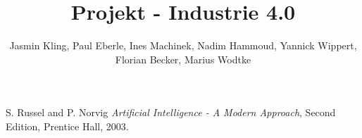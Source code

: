 \documentclass[cover]{isas-seminar}
\title{Projekt - Industrie 4.0}
\author{Jasmin Kling, Paul Eberle, Ines Machinek, Nadim Hammoud, Yannick Wippert, Florian Becker, Marius Wodtke}
\begin{document}
\maketitle

\begin{abstract}
\end{abstract}
\clearpage
\tableofcontents
\cleardoublepage













%

%

\newpage 


\begin{thebibliography}{99}

 {\sc S. Russel and P. Norvig }  \textit{Artificial Intelligence - A Modern Approach},
Second Edition, Prentice Hall, 2003.

\end{thebibliography}
\end{document}
